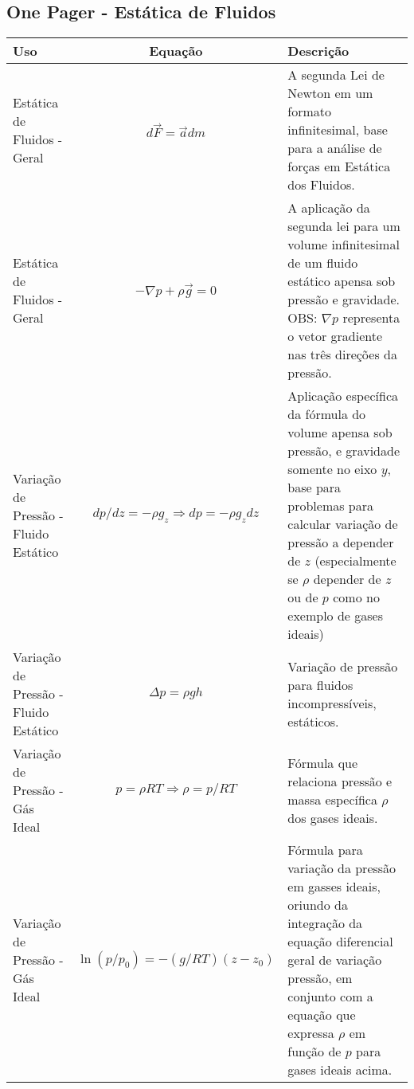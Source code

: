\documentclass{article}
\begin{document}
        \newpage

        \subsection{One Pager - Estática de Fluidos}

        \begin{table}[h]\tiny
            \begin{tabularx}{\textwidth}{|l|c|X|}\hline
                \textbf{Uso} & \textbf{Equação} & \textbf{Descrição} \\ \hline 

                \rule{0pt}{7ex}Estática de Fluidos - Geral & $d\vec{F} = \vec{a} dm$ & A segunda Lei de Newton em um formato infinitesimal, base para a análise de forças em Estática dos Fluidos. \\[4ex] \hline 
                \rule{0pt}{7ex}Estática de Fluidos - Geral & $- \nabla p + \rho \vec g = 0$ & A aplicação da segunda lei para um volume infinitesimal de um fluido estático apensa sob pressão e gravidade. OBS: $\nabla p$ representa o vetor
                gradiente nas três direções da pressão. \\ [4ex]\hline

                \rule{0pt}{7ex}Variação de Pressão - Fluido Estático & $dp/dz = -\rho g_z \Rightarrow dp = -\rho g_z dz$ & Aplicação específica da fórmula do volume apensa sob pressão, e gravidade somente no eixo
                $y$, base para problemas para calcular variação de pressão a depender de $z$ (especialmente se $\rho$ depender de $z$ ou de $p$ como no exemplo de gases ideais) \\ [4ex]\hline 

                \rule{0pt}{7ex}Variação de Pressão - Fluido Estático & $\Delta p = \rho g h$ & Variação de pressão para fluidos incompressíveis, estáticos. \\ [4ex]\hline

                \rule{0pt}{7ex}Variação de Pressão - Gás Ideal & $p = \rho RT \Rightarrow \rho = p/RT$ & Fórmula que relaciona pressão e massa específica $\rho$ dos gases ideais. \\ [4ex]\hline

                \rule{0pt}{7ex}Variação de Pressão - Gás Ideal & $\ln{(p/p_0)} = -(g/RT)(z - z_0)$ & Fórmula para variação da pressão em gasses ideais, oriundo da integração da equação diferencial geral de variação
                pressão, em conjunto com a equação que expressa $\rho$ em função de $p$ para gases ideais acima. \\ [4ex]\hline

            \end{tabularx}
        \end{table}
        \newpage
\end{document}
